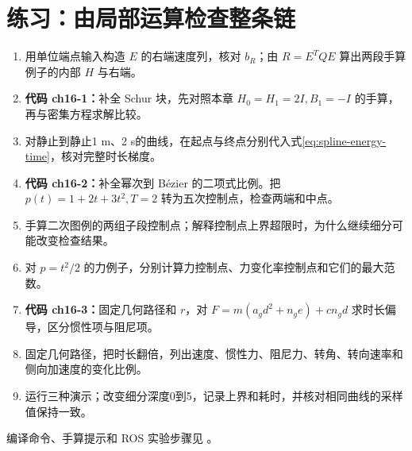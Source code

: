 \section{练习：由局部运算检查整条链}
\begin{enumerate}
\item 用单位端点输入构造 $E$ 的右端速度列，核对 $b_R$；由 $R=E^TQE$ 算出两段手算例子的内部 $H$ 与右端。
\item \textbf{代码 ch16-1：}补全 Schur 块，先对照本章 $H_0=H_1=2I,B_1=-I$ 的手算，再与密集方程求解比较。
\item 对静止到静止1 m、2 s的曲线，在起点与终点分别代入式\eqref{eq:spline-energy-time}，核对完整时长梯度。
\item \textbf{代码 ch16-2：}补全幂次到 Bézier 的二项式比例。把 $p(t)=1+2t+3t^2,T=2$ 转为五次控制点，检查两端和中点。
\item 手算二次图例的两组子段控制点；解释控制点上界超限时，为什么继续细分可能改变检查结果。
\item 对 $p=t^2/2$ 的力例子，分别计算力控制点、力变化率控制点和它们的最大范数。
\item \textbf{代码 ch16-3：}固定几何路径和 $r$，对 $F=m(a_gd^2+n_ge)+cn_gd$ 求时长偏导，区分惯性项与阻尼项。
\item 固定几何路径，把时长翻倍，列出速度、惯性力、阻尼力、转角、转向速率和侧向加速度的变化比例。
\item 运行三种演示；改变细分深度0到5，记录上界和耗时，并核对相同曲线的采样值保持一致。
\end{enumerate}
编译命令、手算提示和 ROS 实验步骤见 。
